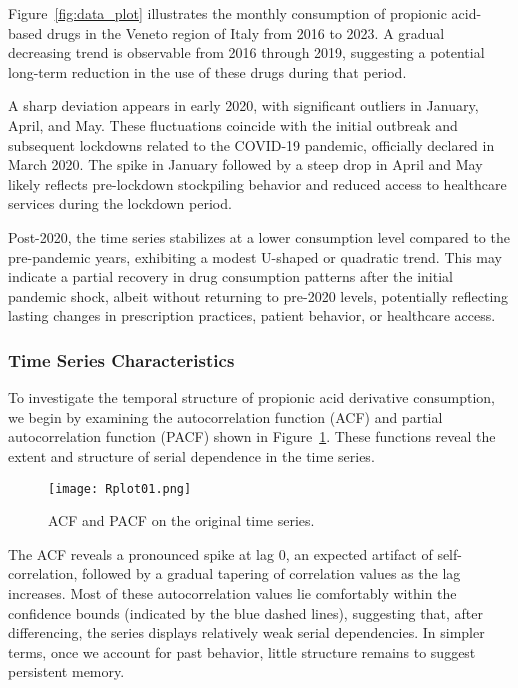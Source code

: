 \documentclass[10pt]{article}
\begin{document}
Figure~\ref{fig:data_plot} illustrates the monthly consumption of propionic acid-based drugs in the Veneto region of Italy from 2016 to 2023. A gradual decreasing trend is observable from 2016 through 2019, suggesting a potential long-term reduction in the use of these drugs during that period.

A sharp deviation appears in early 2020, with significant outliers in January, April, and May. These fluctuations coincide with the initial outbreak and subsequent lockdowns related to the COVID-19 pandemic, officially declared in March 2020. The spike in January followed by a steep drop in April and May likely reflects pre-lockdown stockpiling behavior and reduced access to healthcare services during the lockdown period.

Post-2020, the time series stabilizes at a lower consumption level compared to the pre-pandemic years, exhibiting a modest U-shaped or quadratic trend. This may indicate a partial recovery in drug consumption patterns after the initial pandemic shock, albeit without returning to pre-2020 levels, potentially reflecting lasting changes in prescription practices, patient behavior, or healthcare access.

\subsubsection{Time Series Characteristics}

To investigate the temporal structure of propionic acid derivative consumption, we begin by examining the autocorrelation function (ACF) and partial autocorrelation function (PACF) shown in Figure~\ref{fig:acf_pacf_data}. These functions reveal the extent and structure of serial dependence in the time series.

\begin{figure}[ht]
\centering
\texttt{[image: Rplot01.png]}
\caption{ACF and PACF on the original time series.}
\label{fig:acf_pacf_data}
\end{figure}

The ACF reveals a pronounced spike at lag 0, an expected artifact of self-correlation, followed by a gradual tapering of correlation values as the lag increases. Most of these autocorrelation values lie comfortably within the confidence bounds (indicated by the blue dashed lines), suggesting that, after differencing, the series displays relatively weak serial dependencies. In simpler terms, once we account for past behavior, little structure remains to suggest persistent memory.
\end{document}
